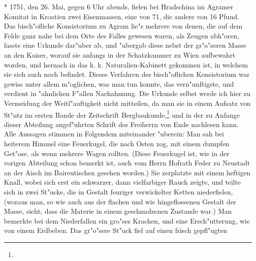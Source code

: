 \documentclass[a4paper, 11pt, oneside, polutonikogreek, german]{article}
\begin{document}
* 1751, den 26. Mai, gegen 6 Uhr abends, fielen bei Hradschina im Agramer Komitat in Kroatien zwei Eisenmassen, eine von 71, die andere von 16 Pfund. Das bisch"ofliche Konsistorium zu Agram lie"s mehrere von denen, die auf dem Felde ganz nahe bei dem Orte des Falles gewesen waren, als Zeugen abh"oren, fasste eine Urkunde dar"uber ab, und "ubergab diese nebst der gr"o"seren Masse an den Kaiser, worauf sie anfangs in der Schatzkammer zu Wien aufbewahrt worden, und hernach in das k. k. Naturalien-Kabinett gekommen ist, in welchem sie sich auch noch befindet. Dieses Verfahren des bisch"oflichen Konsistorium war gewiss unter allem m"oglichen, was man tun konnte, das vern"unftigste, und verdient in "ahnlichen F"allen Nachahmung. Die Urkunde selbst werde ich hier zu Vermeidung der Weitl"auftigkeit nicht mitteilen, da man sie in einem Aufsatz von St"utz im ersten Bande der Zeitschrift Bergbaukunde,\footnote{} und in der zu Anfange dieser Abteilung angef"uhrten Schrift des Freiherrn von Ende nachlesen kann. Alle Aussagen stimmen in Folgendem miteinander "uberein: Man sah bei heiterem Himmel eine Feuerkugel, die nach Osten zog, mit einem dumpfen Get"ose, als wenn mehrere Wagen rollten. (Diese Feuerkugel ist, wie in der vorigen Abteilung schon bemerkt ist, auch vom Herrn Hofrath Feder zu Neustadt an der Aisch im Baireutischen gesehen worden.) Sie zerplatzte mit einem heftigen Knall, wobei sich erst ein schwarzer, dann vielfarbiger Rauch zeigte, und teilte sich in zwei St"ucke, die in Gestalt feuriger verwickelter Ketten niederfielen, (woraus man, so wie auch aus der flachen und wie hingeflossenen Gestalt der Masse, sieht, dass die Materie in einem geschmolzenen Zustande war.) Man bemerkte bei dem Niederfallen ein gro"ses Krachen, und eine Ersch"utterung, wie von einem Erdbeben. Das gr"o"sere St"uck fiel auf einen frisch gepfl"ugten 
\end{document}
